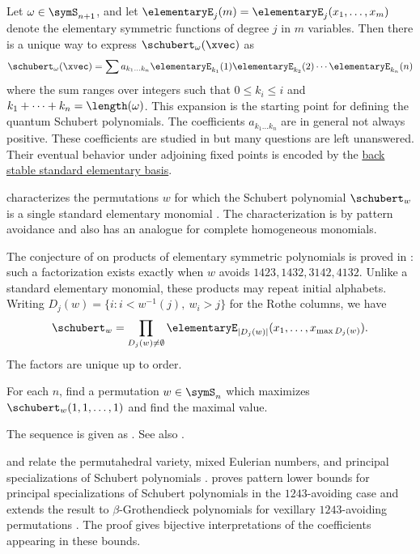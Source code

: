 Let $\omega \in \symS_{n+1}$, and let $\elementaryE_{j}(m) = \elementaryE_{j}(x_1,\dotsc,x_m)$
denote the elementary symmetric functions of degree $j$ in $m$ variables.
Then there is a unique way to express $\schubert_\omega(\xvec)$ as
\[
\schubert_\omega(\xvec) = \sum a_{k_1 \dotsc k_n} \elementaryE_{k_1}(1) \elementaryE_{k_2}(2) \dotsm \elementaryE_{k_n}(n)
\]
where the sum ranges over integers such that $0 \leq k_i \leq i$ and $k_1+\dotsb + k_n = \length(\omega)$.
This expansion is the starting point for defining the quantum Schubert polynomials.
The coefficients $a_{k_1 \dotsc k_n}$ are in general not always positive.
These coefficients are studied in \cite{Winkel1998} but many questions are left unanswered.
Their eventual behavior under adjoining fixed points is encoded by the
\hyperref[backStableSEM]{back stable standard elementary basis}.

 characterizes the permutations $w$ for which the
Schubert polynomial $\schubert_w$ is a single standard elementary monomial
\cite{Woodruff2025x}.  The characterization is by pattern avoidance and also
has an analogue for complete homogeneous monomials.

The conjecture of  \cite{Makhija2025x} on products of
elementary symmetric polynomials is proved in
\cite[Thm.~1.2]{HanMaSun2026x}: such a factorization exists exactly when
$w$ avoids $1423,1432,3142,4132$. Unlike a standard elementary monomial,
these products may repeat initial alphabets. Writing
$D_j(w)=\{i:i<w^{-1}(j),\ w_i>j\}$ for the Rothe columns, we have
\[
 \schubert_w=\prod_{D_j(w)\ne\emptyset}
 \elementaryE_{|D_j(w)|}(x_1,\dotsc,x_{\max D_j(w)}).
\]
The factors are unique up to order.



\begin{problem}
For each $n$, find a permutation $w\in\symS_n$
which maximizes $\schubert_w(1,1,\dotsc,1)$ and find the maximal value.
\end{problem}
The sequence is given as .
See also \cite{Stanley2017SchubertShenanigans}.

 and  relate the permutahedral
variety, mixed Eulerian numbers, and principal specializations of Schubert
polynomials \cite{NadeauTewari2021}.
 proves pattern lower bounds for principal specializations
of Schubert polynomials in the $1243$-avoiding case and extends the result to
$\beta$-Grothendieck polynomials for vexillary $1243$-avoiding permutations
\cite{Dennin2025}.  The proof gives bijective interpretations of the
coefficients appearing in these bounds.

